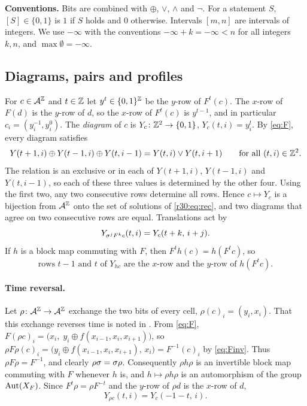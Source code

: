 \medskip
\noindent\textbf{Conventions.} Bits are combined with $\oplus$, $\vee$, $\wedge$ and $\neg$. For a statement $S$, $[S]\in\{0,1\}$ is $1$ if $S$ holds and $0$ otherwise. Intervals $[m,n]$ are intervals of integers. We use $-\infty$ with the conventions $-\infty+k=-\infty<n$ for all integers $k,n$, and $\max\emptyset=-\infty$.

\subsection{Diagrams, pairs and profiles}\label{r30:sec:diagrams}

For $c\in\mathcal{A}^{\mathbb{Z}}$ and $t\in\mathbb{Z}$ let $y^t\in\{0,1\}^{\mathbb{Z}}$ be the $y$-row of $F^t(c)$. The $x$-row of $F(d)$ is the $y$-row of $d$, so the $x$-row of $F^t(c)$ is $y^{t-1}$, and in particular $c_i=(y^{-1}_i,y^0_i)$. The \emph{diagram} of $c$ is $Y_c\colon\mathbb{Z}^2\to\{0,1\}$, $Y_c(t,i)=y^t_i$. By \eqref{eq:F}, every diagram satisfies
\begin{equation}\label{r30:eq:rec}
Y(t+1,i)\oplus Y(t-1,i)\oplus Y(t,i-1)=Y(t,i)\vee Y(t,i+1)\qquad\text{for all }(t,i)\in\mathbb{Z}^2.
\end{equation}
The relation is an exclusive or in each of $Y(t+1,i)$, $Y(t-1,i)$ and $Y(t,i-1)$, so each of these three values is determined by the other four. Using the first two, any two consecutive rows determine all rows. Hence $c\mapsto Y_c$ is a bijection from $\mathcal{A}^{\mathbb{Z}}$ onto the set of solutions of \eqref{r30:eq:rec}, and two diagrams that agree on two consecutive rows are equal. Translations act by
\begin{equation}\label{r30:eq:transl}
Y_{\sigma^jF^kc}(t,i)=Y_c(t+k,\,i+j).
\end{equation}
If $h$ is a block map commuting with $F$, then $F^th(c)=h(F^tc)$, so
\begin{equation}\label{r30:eq:rows}
\text{rows $t-1$ and $t$ of $Y_{hc}$ are the $x$-row and the $y$-row of $h(F^tc)$.}
\end{equation}

\paragraph{Time reversal.} Let $\rho\colon\mathcal{A}^{\mathbb{Z}}\to\mathcal{A}^{\mathbb{Z}}$ exchange the two bits of every cell, $\rho(c)_i=(y_i,x_i)$. That this exchange reverses time is noted in \cite[p.~2500]{Takesue1987}. From \eqref{eq:F}, $F(\rho c)_i=\bigl(x_i,\;y_i\oplus f(x_{i-1},x_i,x_{i+1})\bigr)$, so $\rho F\rho(c)_i=\bigl(y_i\oplus f(x_{i-1},x_i,x_{i+1}),\,x_i\bigr)=F^{-1}(c)_i$ by \eqref{eq:Finv}. Thus $\rho F\rho=F^{-1}$, and clearly $\rho\sigma=\sigma\rho$. Consequently $\rho h\rho$ is an invertible block map commuting with $F$ whenever $h$ is, and $h\mapsto\rho h\rho$ is an automorphism of the group $\operatorname{Aut}(X_F)$. Since $F^t\rho=\rho F^{-t}$ and the $y$-row of $\rho d$ is the $x$-row of $d$,
\begin{equation}\label{r30:eq:rho}
Y_{\rho c}(t,i)=Y_c(-1-t,\,i).
\end{equation}

